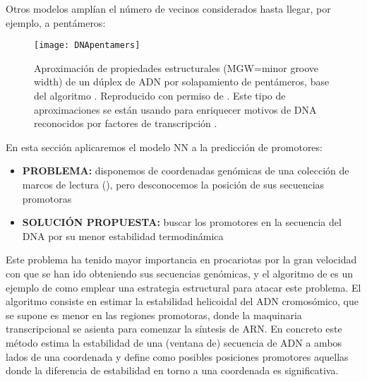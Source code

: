


Otros modelos ampl\'{i}an el n\'{u}mero de vecinos considerados hasta llegar, por ejemplo, a pent\'{a}meros:

\begin{figure}
\begin{center} 
\texttt{[image: DNApentamers]}
\caption
{
Aproximaci\'{o}n de propiedades estructurales (MGW=minor groove width) de un d\'{u}plex de ADN por solapamiento de pent\'{a}meros, 
base del algoritmo . 
Reproducido con permiso de \citet{Zhou2013}.
Este tipo de aproximaciones se est\'{a}n usando para enriquecer motivos de DNA reconocidos por factores de transcripci\'{o}n \citep{Yang2015}.
}
\label{fig:NN5}
\end{center}
\end{figure}

En esta secci\'{o}n aplicaremos el modelo NN a la predicci\'{o}n de promotores:

\begin{itemize}
\item \textbf{PROBLEMA:} disponemos de coordenadas gen\'{o}micas de una colecci\'{o}n de marcos de lectura 
(), 
pero desconocemos la posici\'{o}n de sus secuencias promotoras
\item \textbf{SOLUCI\'{O}N PROPUESTA:} buscar los promotores en la secuencia del DNA por su menor estabilidad termodin\'{a}mica
\end{itemize}

Este problema ha tenido mayor importancia en procariotas por la gran velocidad con que se han ido obteniendo sus secuencias gen\'{o}micas, 
y el algoritmo de \cite{Kanhere2005} es un ejemplo de como emplear una estrategia estructural para atacar este problema. 
El algoritmo consiste en estimar la estabilidad helicoidal del ADN cromos\'{o}mico, que se supone es menor en
las regiones promotoras, donde la maquinaria transcripcional se asienta para comenzar la s\'{i}ntesis de ARN. 
En concreto este m\'{e}todo estima la estabilidad de una (ventana de) secuencia de ADN a ambos lados de una coordenada y define como posibles
posiciones promotores aquellas donde la diferencia de estabilidad en torno a una coordenada es significativa. 

